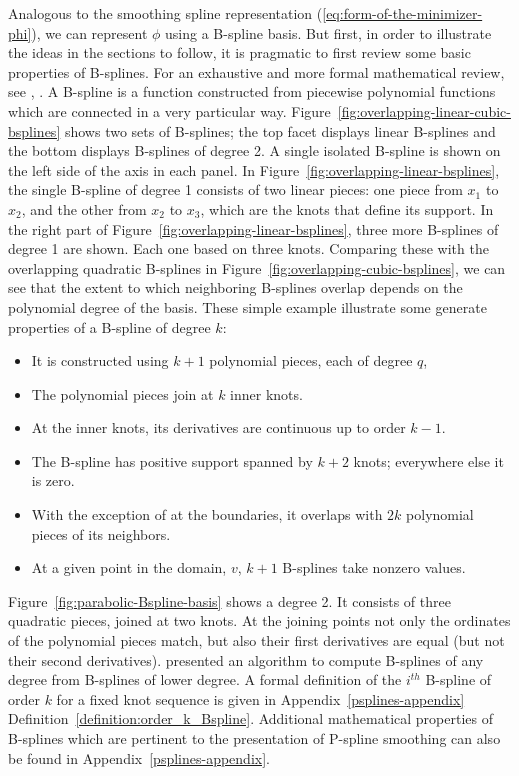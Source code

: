 Analogous to the smoothing spline representation (\ref{eq:form-of-the-minimizer-phi}), we can represent $\phi$ using a B-spline basis. But first, in order to illustrate the ideas in the sections to follow, it is pragmatic to first review some basic properties of B-splines. For an exhaustive and more formal mathematical review, see  \cite{de1978practical}, \cite{dierckx1995curve}. A B-spline is a function constructed from piecewise polynomial functions which are connected in a very particular way.  Figure~\ref{fig:overlapping-linear-cubic-bsplines} shows two sets of B-splines; the top facet displays linear B-splines and the bottom displays B-splines of degree 2. A single isolated B-spline is shown on the left side of the axis in each panel. In Figure~\ref{fig:overlapping-linear-bsplines}, the single B-spline of degree 1 consists of two linear pieces: one piece from $x_1$ to $x_2$, and the other from $x_2$ to $x_3$, which are the knots that define its support. In the right part of Figure~\ref{fig:overlapping-linear-bsplines}, three more B-splines of degree 1 are shown. Each one based on three knots. Comparing these with the overlapping quadratic B-splines in Figure~\ref{fig:overlapping-cubic-bsplines}, we can see that the extent to which neighboring B-splines overlap depends on the polynomial degree of the basis. These simple example illustrate some generate properties of a B-spline of degree $k$:

\begin{itemize}
\item It is constructed using $k + 1$ polynomial pieces, each of degree $q$,
\item The polynomial pieces join at $k$ inner knots.
\item At the inner knots, its derivatives are continuous up to order $k-1$.
\item The B-spline has positive support spanned by $k + 2$ knots; everywhere else it is zero.
\item With the exception of at the boundaries, it overlaps with $2k$ polynomial pieces of its neighbors.
\item At a given point in the domain, $v$, $k + 1$ B-splines take nonzero values.
\end{itemize}

Figure~\ref{fig:parabolic-Bspline-basis} shows a degree 2. It consists of three quadratic pieces, joined at two knots. At the joining points not only the ordinates of the polynomial pieces match, but also their first derivatives are equal (but not their second derivatives).  \cite{de1978practical} presented an algorithm to compute B-splines of any degree from B-splines of lower degree.  A formal definition of the $i^{th}$ B-spline of order $k$ for a fixed knot sequence is given in Appendix~\ref{psplines-appendix} Definition~\ref{definition:order_k_Bspline}. Additional mathematical properties of B-splines which are pertinent to the presentation of P-spline smoothing can also be found in Appendix~\ref{psplines-appendix}.

